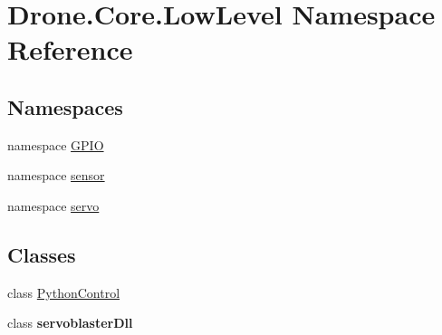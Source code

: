 \hypertarget{namespace_drone_1_1_core_1_1_low_level}{}\section{Drone.\+Core.\+Low\+Level Namespace Reference}
\label{namespace_drone_1_1_core_1_1_low_level}
\subsection*{Namespaces}
\begin{DoxyCompactItemize}
\item 
namespace \hyperlink{namespace_drone_1_1_core_1_1_low_level_1_1_g_p_i_o}{G\+P\+I\+O}
\item 
namespace \hyperlink{namespace_drone_1_1_core_1_1_low_level_1_1sensor}{sensor}
\item 
namespace \hyperlink{namespace_drone_1_1_core_1_1_low_level_1_1servo}{servo}
\end{DoxyCompactItemize}
\subsection*{Classes}
\begin{DoxyCompactItemize}
\item 
class \hyperlink{class_drone_1_1_core_1_1_low_level_1_1_python_control}{Python\+Control}
\item 
class {\bfseries servoblaster\+Dll}
\end{DoxyCompactItemize}
